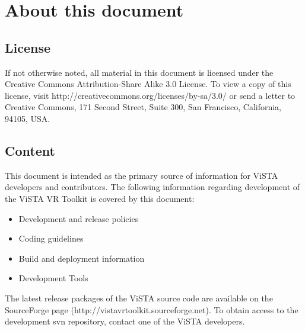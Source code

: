 



\section{About this document}

\subsection{License}
If not otherwise noted, all material in this document is licensed under the Creative Commons Attribution-Share Alike 3.0 License. 
To view a copy of this license, visit http://creativecommons.org/licenses/by-sa/3.0/ or send a letter to Creative Commons, 171 Second Street, Suite 300, San Francisco, California, 94105, USA.

\subsection{Content}

This document is intended as the primary source of information for ViSTA developers and contributors.
The following information regarding development of the ViSTA VR Toolkit is covered by this document:

\begin{itemize}
\item Development and release policies
\item Coding guidelines
\item Build and deployment information
\item Development Tools
\end{itemize}

The latest release packages of the ViSTA source code are available on the SourceForge page (http://vistavrtoolkit.sourceforge.net).
To obtain access to the development svn repository, contact one of the ViSTA developers.
